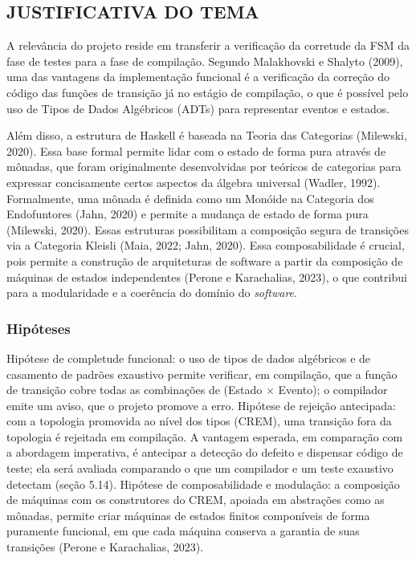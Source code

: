 \documentclass[12pt,a4paper]{article}
\begin{document}
\subsection{JUSTIFICATIVA DO TEMA}

A relevância do projeto reside em transferir a verificação da corretude da FSM da fase de testes para a fase de compilação. Segundo Malakhovski e Shalyto (2009), uma das vantagens da implementação funcional é a verificação da correção do código das funções de transição já no estágio de compilação, o que é possível pelo uso de Tipos de Dados Algébricos (ADTs) para representar eventos e estados.

Além disso, a estrutura de Haskell é baseada na Teoria das Categorias (Milewski, 2020). Essa base formal permite lidar com o estado de forma pura através de mônadas, que foram originalmente desenvolvidas por teóricos de categorias para expressar concisamente certos aspectos da álgebra universal (Wadler, 1992). Formalmente, uma mônada é definida como um Monóide na Categoria dos Endofuntores (Jahn, 2020) e permite a mudança de estado de forma pura (Milewski, 2020). Essas estruturas possibilitam a composição segura de transições via a Categoria Kleisli (Maia, 2022; Jahn, 2020). Essa composabilidade é crucial, pois permite a construção de arquiteturas de software a partir da composição de máquinas de estados independentes (Perone e Karachalias, 2023), o que contribui para a modularidade e a coerência do domínio do \textit{software}.

\subsubsection{Hipóteses}
Hipótese de completude funcional: o uso de tipos de dados algébricos e de casamento de padrões exaustivo permite verificar, em compilação, que a função de transição cobre todas as combinações de (Estado $\times$ Evento); o compilador emite um aviso, que o projeto promove a erro. Hipótese de rejeição antecipada: com a topologia promovida ao nível dos tipos (CREM), uma transição fora da topologia é rejeitada em compilação. A vantagem esperada, em comparação com a abordagem imperativa, é antecipar a detecção do defeito e dispensar código de teste; ela será avaliada comparando o que um compilador e um teste exaustivo detectam (seção 5.14). Hipótese de composabilidade e modulação: a composição de máquinas com os construtores do CREM, apoiada em abstrações como as mônadas, permite criar máquinas de estados finitos componíveis de forma puramente funcional, em que cada máquina conserva a garantia de suas transições (Perone e Karachalias, 2023).
\end{document}
